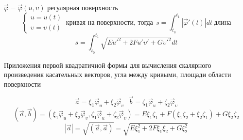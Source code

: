 \begin{block}
  $\vec \varphi = \vec \varphi(u, \upsilon)$ регулярная поверхность
  $$
  \left\{
    \begin{array}{l}
      u = u(t) \\
      \upsilon = \upsilon(t)
    \end{array}
  \right. ~ \text{кривая на поверхности, тогда} ~~
  s = \int_{t_0}^{t_1} |\vec \varphi'(t)| dt ~ \text{длина}
  $$
  $$
  s = \int_{t_0}^{t_1} \sqrt{E u'^2 + 2Fu'\upsilon' + G\upsilon'^2}dt
  $$
\end{block}

\begin{title}[\Large]
  Приложения первой квадратичной формы для вычисления скалярного произведения
  касательных векторов, угла между кривыми, площади области поверхности
\end{title}

\begin{block}
  $$
  \vec a = \xi_1 \vec \varphi_u + \xi_2 \vec \varphi_{\upsilon} ~~~
  \vec b = \zeta_1 \vec \varphi_u + \zeta_2 \vec \varphi_{\upsilon}
  $$
  $$
  (\vec a, \vec b) = (\xi_1 \vec \varphi_u + \xi_2 \vec \varphi_{\upsilon},
  \zeta_1 \vec \varphi_u + \zeta_2 \vec \varphi_{\upsilon}) =
  E \xi_1 \zeta_1 + F(\xi_1 \zeta_2 + \xi_2 \zeta_1) + G\xi_2 \zeta_2
  $$
  $$
  |\vec a| = \sqrt{(\vec a, \vec a)} = \sqrt{E\xi_1^2 + 2F\xi_1 \xi_2 +
  G\xi_2^2}
  $$
\end{block}

